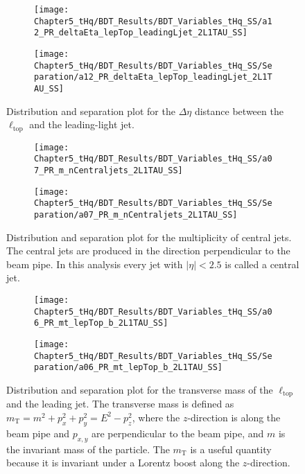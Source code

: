 \begin{figure}[h]
\centering
\begin{subfigure}{.45\textwidth}
  \centering
  \texttt{[image: Chapter5\_tHq/BDT\_Results/BDT\_Variables\_tHq\_SS/a12\_PR\_deltaEta\_lepTop\_leadingLjet\_2L1TAU\_SS]}
\end{subfigure}%
\begin{subfigure}{.55\textwidth}
  \centering
  \texttt{[image: Chapter5\_tHq/BDT\_Results/BDT\_Variables\_tHq\_SS/Separation/a12\_PR\_deltaEta\_lepTop\_leadingLjet\_2L1TAU\_SS]}
\end{subfigure}
\caption{Distribution and separation plot for the $\Delta \eta$ distance between the $\ell_{\text{top}}$ and the leading-light jet.}
\label{fig:Appendix:BDTVARS:tHqSS:a12_PR_deltaEta_lepTop_leadingLjet}
\end{figure}

\begin{figure}[h]
\centering
\begin{subfigure}{.45\textwidth}
  \centering
  \texttt{[image: Chapter5\_tHq/BDT\_Results/BDT\_Variables\_tHq\_SS/a07\_PR\_m\_nCentraljets\_2L1TAU\_SS]}
\end{subfigure}%
\begin{subfigure}{.55\textwidth}
  \centering
  \texttt{[image: Chapter5\_tHq/BDT\_Results/BDT\_Variables\_tHq\_SS/Separation/a07\_PR\_m\_nCentraljets\_2L1TAU\_SS]}
\end{subfigure}
\caption{Distribution and separation plot for the multiplicity of central jets.
The central jets are produced in the direction perpendicular to the beam pipe.
In this analysis every jet with $|\eta| < 2.5$ is called a central jet.}
\label{fig:Appendix:BDTVARS:tHqSS:a07_PR_m_nCentraljets}
\end{figure}


\begin{figure}[h]
\centering
\begin{subfigure}{.45\textwidth}
  \centering
  \texttt{[image: Chapter5\_tHq/BDT\_Results/BDT\_Variables\_tHq\_SS/a06\_PR\_mt\_lepTop\_b\_2L1TAU\_SS]}
\end{subfigure}%
\begin{subfigure}{.55\textwidth}
  \centering
  \texttt{[image: Chapter5\_tHq/BDT\_Results/BDT\_Variables\_tHq\_SS/Separation/a06\_PR\_mt\_lepTop\_b\_2L1TAU\_SS]}
\end{subfigure}
\caption{Distribution and separation plot for the transverse mass of the $\ell_{\text{top}}$ and the leading \btagged jet. 
The transverse mass is defined as $m_{\text{T}} = m^{2} + p_{x}^{2} + p_{y}^{2} = E^{2} - p_{z}^{2}$, where the $z$-direction 
is along the beam pipe and $p_{x, y}$ are perpendicular to the beam pipe, and $m$ is the invariant mass of the particle.
The $m_{\text{T}}$ is a useful quantity because it is invariant under a Lorentz boost along the $z$-direction.}
\label{fig:Appendix:BDTVARS:tHqSS:a06_PR_mt_lepTop_b}
\end{figure}


